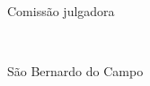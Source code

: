 \documentclass{article}
\providecommand{\cidade}{São Bernardo do Campo}
\begin{document}
 

  \thispagestyle{empty}
  \begin{center}
    \uppercase\expandafter{\alunos}
    
    \vfill
     
    \textbf{\MakeUppercase{\titulo}}
    
    \vfill
    
    \begin{flushright}
      \begin{minipage}{6cm}
        \normalsize
          \descricao
      \end{minipage}
    \end{flushright}
    
    \vfill
    

      \begin{minipage}{10cm}
        \begin{center}
        \normalsize
        Comissão julgadora
        \vspace*{0.05\textheight}

        \hrulefill \\
        \orientador
        \vspace*{0.05\textheight}
            
        \assinaturasBanca
        
        \end{center}
      \end{minipage}

    \vfill

    \cidade\\[0.5em]
    \ano

  \end{center}%
  \clearpage
\end{document}

